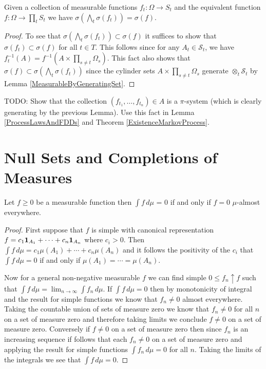 \begin{lem}Given a collection of measurable functions $f_t : \Omega
  \to S_t$ and the equivalent function $f : \Omega \to \prod_t S_t$ we
  have $\sigma(\bigwedge_t \sigma(f_t)) = \sigma(f)$.
\end{lem}
\begin{proof}
To see that $\sigma(\bigwedge_t \sigma(f_t)) \subset \sigma(f)$ it
suffices to show that $\sigma(f_t) \subset \sigma(f)$ for all $t \in
T$.  This follows since for any $A_t \in \mathcal{S}_t$, we have
$f_t^{-1}(A) = f^{-1}(A \times  \prod_{s \neq t} \Omega_s)$.  This
fact also shows that $\sigma(f) \subset \sigma(\bigwedge_t
\sigma(f_t))$ since the cylinder sets $A \times  \prod_{s \neq t}
\Omega_s$ generate $\otimes_t \mathcal{S}_t$ by Lemma \ref{MeasurableByGeneratingSet}.
\end{proof}

TODO: Show that the collection $(f_{t_1}, \dotsc, f_{t_n}) \in A$ is a
$\pi$-system (which is clearly generating by the previous Lemma).  Use
this fact in Lemma \ref{ProcessLawsAndFDDs} and Theorem \ref{ExistenceMarkovProcess}.

\section{Null Sets and Completions of Measures}
\begin{lem}Let $f \geq 0$ be a measurable function then $\int f \,
  d\mu$ = 0 if and only if $f = 0$ $\mu$-almost everywhere.
\end{lem}
\begin{proof}
First suppose that $f$ is simple with canonical representation $f = c_1
\textbf{1}_{A_1} + \dotsb +  c_n
\textbf{1}_{A_n}$ where $c_i > 0$.  Then $\int f \, d\mu = c_1
\mu(A_1) + \dotsb +  c_n
\mu(A_n)$ and it follows the positivity of the $c_i$ that $\int f \, d\mu =0$ if and only if
$\mu(A_1) = \dotsb = \mu(A_n)$.

Now for a general non-negative measurable $f$ we can find simple $0
\leq f_n \uparrow f$ such that $\int f \, d\mu = \lim_{n \to \infty}
\int f_n \, d\mu$.  If $\int f\, d\mu = 0$ then by monotonicity of
integral and the result for simple functions we know that $f_n \neq 0$
almost everywhere.  Taking the countable union of sets of measure zero we know
that $f_n \neq 0$ for all $n$ on a set of measure zero and therefore
taking limits we conclude $f \neq 0$ on a set of measure zero.
Conversely if $f \neq 0$ on a set of measure zero then since $f_n$ is
an increasing sequence if follows that each $f_n \neq 0$ on a set of
measure zero and applying the result for simple functions $\int f_n \,
d\mu =0$ for all $n$.  Taking the limits of the integrals we see that
$\int f \, d\mu =0$.
\end{proof}

